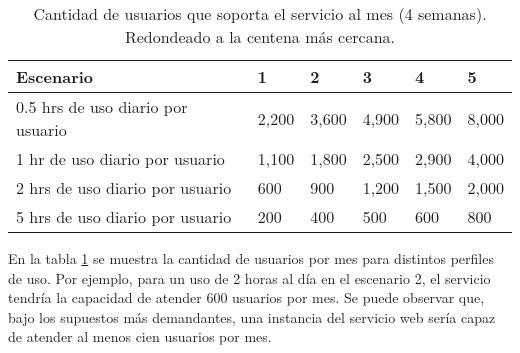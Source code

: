 \begin{table}[!ht]
    \centering
    \caption{ Cantidad de usuarios que soporta el servicio al mes (4 semanas).
        Redondeado a la centena más cercana. }
    \begin{tabular}{|l|l|l|l|l|l|}
    \hline
        Escenario & 1 & 2 & 3 & 4 & 5 \\ \hline
        0.5 hrs de uso diario por usuario & 2,200 & 3,600 & 4,900 & 5,800 & 8,000 \\ \hline
          1 hr  de uso diario por usuario & 1,100 & 1,800 & 2,500 & 2,900 & 4,000 \\ \hline
          2 hrs de uso diario por usuario & 600   & 900   & 1,200 & 1,500 & 2,000 \\ \hline
          5 hrs de uso diario por usuario & 200   & 400   & 500   & 600   & 800   \\ \hline
    \end{tabular}
    \label{CPCU}
\end{table}

En la tabla \ref{CPCU} se muestra la cantidad de usuarios por mes para distintos
perfiles de uso. Por ejemplo, para un uso de 2 horas al día en el escenario 2,
el servicio tendría la capacidad de atender 600 usuarios por mes. Se puede
observar que, bajo los supuestos más demandantes, una instancia del servicio web
sería capaz de atender al menos cien usuarios por mes.

